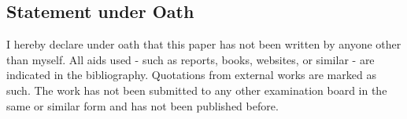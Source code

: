 \subsection*{Statement under Oath}

I hereby declare under oath that this paper has not been written by anyone other than myself. All aids used - such as reports, books, websites, or similar - are indicated in the bibliography. Quotations from external works are marked as such. The work has not been submitted to any other examination board in the same or similar form and has not been published before.\\

\thesisDate \\

\studentName

\vspace{20px}
